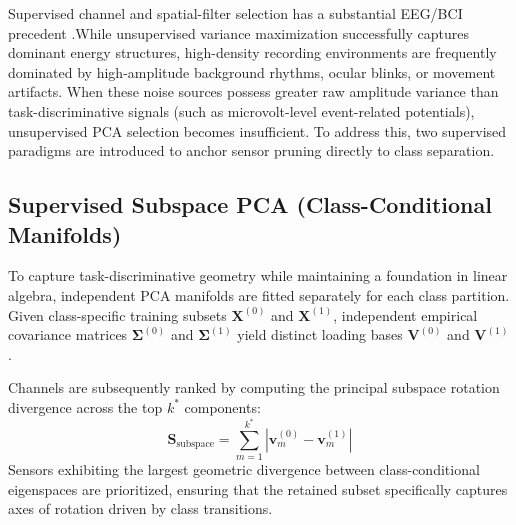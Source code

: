 \noindent
Supervised channel and spatial-filter selection has a substantial EEG/BCI
precedent
\citep{lal2004channel,ramoser2000csp,arvaneh2011sparsecsp}.While unsupervised variance maximization successfully captures dominant energy structures, high-density recording environments are frequently dominated by high-amplitude background rhythms, ocular blinks, or movement artifacts. When these noise sources possess greater raw amplitude variance than task-discriminative signals (such as microvolt-level event-related potentials), unsupervised PCA selection becomes insufficient. To address this, two supervised paradigms are introduced to anchor sensor pruning directly to class separation.

\subsection{Supervised Subspace PCA (Class-Conditional Manifolds)}
\noindent
To capture task-discriminative geometry while maintaining a foundation in linear algebra, independent PCA manifolds are fitted separately for each class partition. Given class-specific training subsets $\mathbf{X}^{(0)}$ and $\mathbf{X}^{(1)}$, independent empirical covariance matrices $\mathbf{\Sigma}^{(0)}$ and $\mathbf{\Sigma}^{(1)}$ yield distinct loading bases $\mathbf{V}^{(0)}$ and $\mathbf{V}^{(1)}$. 

\noindent
Channels are subsequently ranked by computing the principal subspace rotation divergence across the top $k^*$ components:
\begin{equation}
    \mathbf{S}_{\text{subspace}} = \sum_{m=1}^{k^*} \left| \mathbf{v}_m^{(0)} - \mathbf{v}_m^{(1)} \right|
\end{equation}
Sensors exhibiting the largest geometric divergence between class-conditional eigenspaces are prioritized, ensuring that the retained subset specifically captures axes of rotation driven by class transitions.

